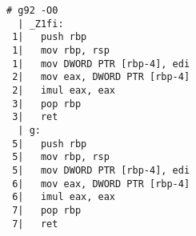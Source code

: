 \begin{lstlisting}[language={},numbers=none,title=\href{https://godbolt.org/z/cj7bqx}{\texttt{godbolt.org/z/cj7bqx}}]
# g92 -O0
  | _Z1fi:
 1|   push rbp
 1|   mov rbp, rsp
 1|   mov DWORD PTR [rbp-4], edi
 2|   mov eax, DWORD PTR [rbp-4]
 2|   imul eax, eax
 3|   pop rbp
 3|   ret
  | g:
 5|   push rbp
 5|   mov rbp, rsp
 5|   mov DWORD PTR [rbp-4], edi
 6|   mov eax, DWORD PTR [rbp-4]
 6|   imul eax, eax
 7|   pop rbp
 7|   ret
\end{lstlisting}
